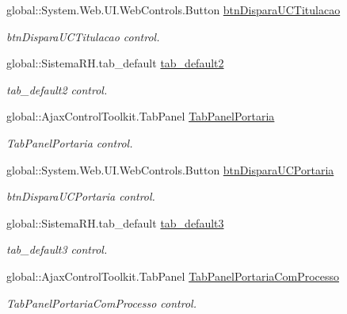 \begin{DoxyCompactItemize}
global::System.Web.UI.WebControls.Button \hyperlink{class_sistema_r_h_1_1_cadastro_docs_afa84dbdf065cac183b6b3c84949bc0e5}{btnDisparaUCTitulacao}
\begin{DoxyCompactList}\small\item\em btnDisparaUCTitulacao control. \item\end{DoxyCompactList}\item 
global::SistemaRH.tab\_\-default \hyperlink{class_sistema_r_h_1_1_cadastro_docs_ac813ec9ac8f627e74066746c0733114c}{tab\_\-default2}
\begin{DoxyCompactList}\small\item\em tab\_\-default2 control. \item\end{DoxyCompactList}\item 
global::AjaxControlToolkit.TabPanel \hyperlink{class_sistema_r_h_1_1_cadastro_docs_a0a4d4ac63fe4a8b43af5c125e94025a7}{TabPanelPortaria}
\begin{DoxyCompactList}\small\item\em TabPanelPortaria control. \item\end{DoxyCompactList}\item 
global::System.Web.UI.WebControls.Button \hyperlink{class_sistema_r_h_1_1_cadastro_docs_ad0ac6383b315acbfc97bb88293db52f8}{btnDisparaUCPortaria}
\begin{DoxyCompactList}\small\item\em btnDisparaUCPortaria control. \item\end{DoxyCompactList}\item 
global::SistemaRH.tab\_\-default \hyperlink{class_sistema_r_h_1_1_cadastro_docs_af699a2c2389bdf5e1dcf7a2e8e3c9ce0}{tab\_\-default3}
\begin{DoxyCompactList}\small\item\em tab\_\-default3 control. \item\end{DoxyCompactList}\item 
global::AjaxControlToolkit.TabPanel \hyperlink{class_sistema_r_h_1_1_cadastro_docs_acb79f98f49970fb8051bd947de410ef4}{TabPanelPortariaComProcesso}
\begin{DoxyCompactList}\small\item\em TabPanelPortariaComProcesso control. \item\end{DoxyCompactList}\item 

\end{DoxyCompactItemize}
